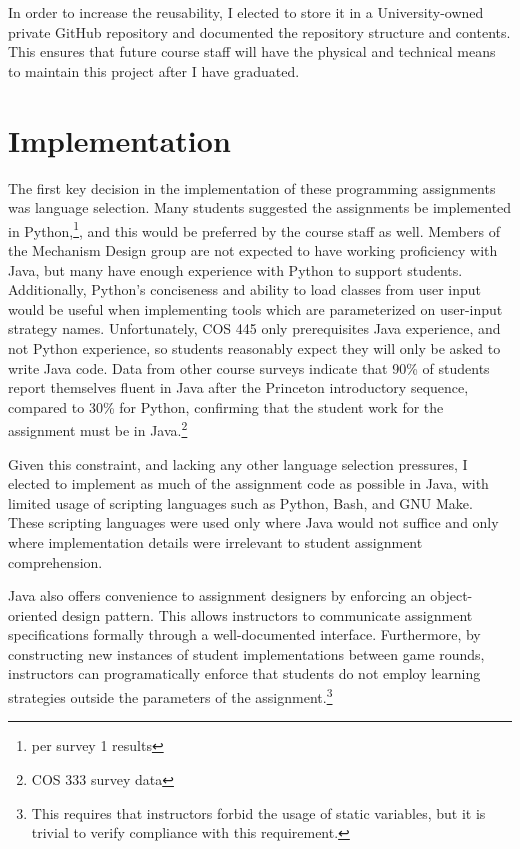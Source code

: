 \documentclass[pageno]{jpaper}
\begin{document}
In order to increase the reusability, I elected to store it in a University-owned private GitHub repository and documented the repository structure and contents.
This ensures that future course staff will have the physical and technical means to maintain this project after I have graduated.

\section*{Implementation}
The first key decision in the implementation of these programming assignments was language selection.
Many students suggested the assignments be implemented in Python,\footnote{per survey 1 results}, and this would be preferred by the course staff as well.
Members of the Mechanism Design group are not expected to have working proficiency with Java, but many have enough experience with Python to support students.
Additionally, Python's conciseness and ability to load classes from user input would be useful when implementing tools which are parameterized on user-input strategy names.
Unfortunately, COS 445 only prerequisites Java experience, and not Python experience, so students reasonably expect they will only be asked to write Java code.
Data from other course surveys indicate that 90\% of students report themselves fluent in Java after the Princeton introductory sequence, compared to 30\% for Python, confirming that the student work for the assignment must be in Java.\footnote{COS 333 survey data}

Given this constraint, and lacking any other language selection pressures, I elected to implement as much of the assignment code as possible in Java, with limited usage of scripting languages such as Python, Bash, and GNU Make.
These scripting languages were used only where Java would not suffice and only where implementation details were irrelevant to student assignment comprehension.

Java also offers convenience to assignment designers by enforcing an object-oriented design pattern.
This allows instructors to communicate assignment specifications formally through a well-documented interface.
Furthermore, by constructing new instances of student implementations between game rounds, instructors can programatically enforce that students do not employ learning strategies outside the parameters of the assignment.\footnote{This requires that instructors forbid the usage of static variables, but it is trivial to verify compliance with this requirement.}
\end{document}
